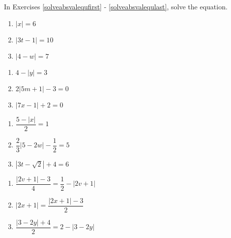 \documentclass{ximera}
\begin{document}
	\author{Stitz-Zeager}


\label{ExercisesforAppAbsValEqIneq}

In Exercises \ref{solveabsvalequfirst} - \ref{solveabsvalequlast}, solve the equation.

\begin{multicols}{3}
\begin{enumerate}

\item  $|x| = 6$ \label{solveabsvalequfirst} 
\item $|3t-1| = 10$
\item $|4-w| = 7$

\setcounter{HW}{\value{enumi}}
\end{enumerate}
\end{multicols}

\begin{multicols}{3}
\begin{enumerate}
\setcounter{enumi}{\value{HW}}

\item  $4 - |y| = 3$
\item $2|5m+1| - 3 = 0$
\item $|7x-1| + 2 = 0$

\setcounter{HW}{\value{enumi}}
\end{enumerate}
\end{multicols}

\begin{multicols}{3}
\begin{enumerate}
\setcounter{enumi}{\value{HW}}

\item $\dfrac{5 - |x|}{2} = 1$ 
\item $\dfrac{2}{3} |5-2w| - \dfrac{1}{2} = 5$ 
\item $|3t - \sqrt{2}| + 4 = 6$ 
\setcounter{HW}{\value{enumi}}
\end{enumerate}
\end{multicols}


\begin{multicols}{3}
\begin{enumerate}
\setcounter{enumi}{\value{HW}}

\item $\dfrac{|2v+1| - 3}{4} = \dfrac{1}{2} - |2v+1|$
\item $|2x+1| = \dfrac{|2x+1| - 3}{2}$
\item $\dfrac{|3-2y|+ 4}{2} = 2 - |3-2y|$

\setcounter{HW}{\value{enumi}}
\end{enumerate}
\end{multicols}
\end{document}
